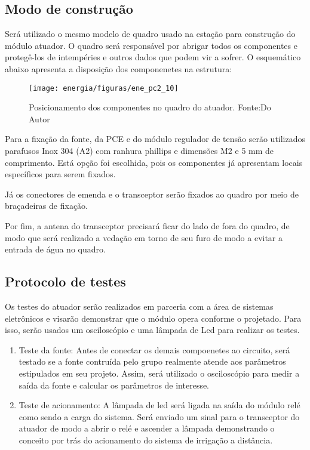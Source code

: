 \subsection{Modo de construção}

Será utilizado o mesmo modelo de quadro usado na estação para construção do módulo atuador. O quadro será responsável por abrigar todos os componentes e protegê-los de intempéries e outros dados que podem vir a sofrer. O esquemático abaixo apresenta a disposição dos componenetes na estrutura:

\begin{figure}[H]
		\centering
		\texttt{[image: energia/figuras/ene\_pc2\_10]}
		\caption{Posicionamento dos componentes no quadro do atuador. Fonte:Do Autor}
		\label{ene_pc2_10}
\end{figure}

Para a fixação da fonte, da PCE e do módulo regulador de tensão serão utilizados parafusos Inox 304 (A2) com ranhura phillips e dimensões M2 e 5 mm de comprimento. Está opção foi escolhida, pois os componentes já apresentam locais específicos para serem fixados.

Já os conectores de emenda e o transceptor serão fixados ao quadro por meio de braçadeiras de fixação.

Por fim, a antena do transceptor precisará ficar do lado de fora do quadro, de modo que será realizado a vedação em torno de seu furo de modo a evitar a entrada de água no quadro.

\subsection{Protocolo de testes}

Os testes do atuador serão realizados em parceria com a área de sistemas eletrônicos e visarão demonstrar que o módulo opera conforme o projetado. Para isso, serão usados um osciloscópio e uma lâmpada de Led para realizar os testes.

\begin{enumerate}
   \item Teste da fonte: Antes de conectar os demais compoenetes ao circuito, será testado se a fonte contruída pelo grupo realmente atende aos parâmetros estipulados em seu projeto. Assim, será utilizado o osciloscópio para medir a saída da fonte e calcular os parâmetros de interesse. 
   \item Teste de acionamento: A lâmpada de led será ligada na saída do módulo relé como sendo a carga do sistema. Será enviado um sinal para o transceptor do atuador de modo a abrir o relé e ascender a lâmpada demonstrando o conceito por trás do acionamento do sistema de irrigação a distância.
    \end{enumerate}

